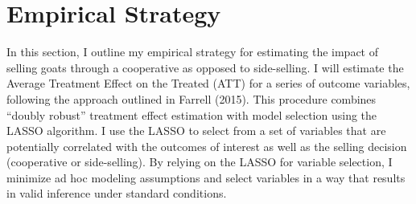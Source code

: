 \documentclass[11pt]{article}
\begin{document}
\singlespacing
\begin{table}[H]
  \centering
  \caption{Member Characteristics: Cooperative vs. Side-Selling}
  \label{table:E2_ss_comp}
\end{table}
\doublespacing


\section{Empirical Strategy} \label{sec:E2_emp}

In this section, I outline my empirical strategy for estimating the impact of selling goats through a cooperative as opposed to side-selling. I will estimate the Average Treatment Effect on the Treated (ATT) for a series of outcome variables, following the approach outlined in Farrell (2015). This procedure combines “doubly robust” treatment effect estimation with model selection using the LASSO algorithm. I use the LASSO to select from a set of variables that are potentially correlated with the outcomes of interest as well as the selling decision (cooperative or side-selling). By relying on the LASSO for variable selection, I minimize ad hoc modeling assumptions and select variables in a way that results in valid inference under standard conditions.
\end{document}

